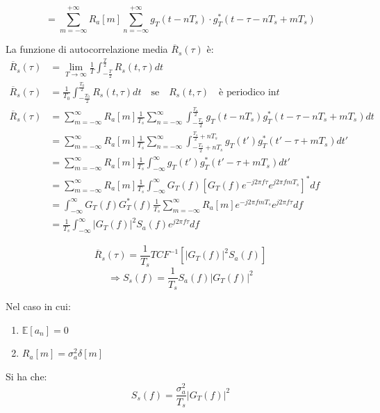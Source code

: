 \[
    = \sum_{m=-\infty}^{+\infty} R_a[m] \sum_{n=-\infty}^{+\infty} g_T(t - nT_s) \cdot g_T^*(t - \tau - nT_s + mT_s)
\]


La funzione di autocorrelazione media \( \overline{R}_s(\tau) \) è:
\begin{align*}
    \overline{R}_s(\tau) & = \lim_{T\to\infty} \frac{1}{T} \int_{-\frac{T}{2}}^{\frac{T}{2}} R_s(t, \tau) dt                                                                       \\
    \overline{R}_s(\tau) & = \frac{1}{T_0} \int_{-\frac{T_0}{2}}^{\frac{T_0}{2}} R_s(t,\tau)dt \quad \text{se} \quad R_s(t,\tau) \quad \text{è periodico in} t                     \\
    \overline{R}_s(\tau) & = \sum_{m=-\infty}^{\infty} R_a[m] \frac{1}{T_s} \sum_{n=-\infty}^{\infty} \int_{-\frac{T_s}{2}}^{\frac{T_s}{2}} g_T(t-nT_s)g_T^*(t-\tau-nT_s+mT_s)dt   \\
                         & = \sum_{m=-\infty}^{\infty} R_a[m] \frac{1}{T_s} \sum_{n=-\infty}^{\infty}\int_{-\frac{T_s}{2}+nT_s}^{\frac{T_s}{2}+nT_s} g_T(t')g_T^*(t'-\tau+mT_s)dt' \\
                         & = \sum_{m=-\infty}^{\infty} R_a[m] \frac{1}{T_s} \int_{-\infty}^{\infty} g_T(t')g_T^*(t'-\tau+mT_s)dt'                                                  \\
                         & = \sum_{m=-\infty}^{\infty} R_a[m] \frac{1}{T_s} \int_{-\infty}^{\infty} G_T(f)[G_T(f)e^{-j2\pi f\tau}e^{j2\pi fmT_s}]^*df                              \\
                         & = \int_{-\infty}^{\infty} G_T(f)G_T^*(f)\frac{1}{T_s} \sum_{m=-\infty}^{\infty} R_a[m] e^{-j2\pi fmT_s}e^{j2\pi f\tau}df                                \\
                         & = \frac{1}{T_s} \int_{-\infty}^{\infty} |G_T(f)|^2 S_a(f)e^{j2\pi f\tau}df
\end{align*}


\[
    \overline{R}_s(\tau) = \frac{1}{T_s} TCF^{-1} \left[ |G_T(f)|^2 S_a(f) \right]
\]
\[
    \Rightarrow S_s(f) = \frac{1}{T_s} S_a(f) |G_T(f)|^2
\]

Nel caso in cui:
\begin{enumerate}
    \item $\mathbb{E} [ a_n ] = 0$
    \item $R_a[m] = \sigma_a^2 \delta[m]$
\end{enumerate}

Si ha che:
\[
    S_s(f) = \frac{\sigma_a^2}{T_s} |G_T(f)|^2
\]

